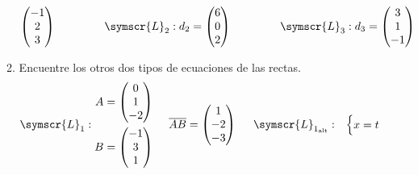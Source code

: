\documentclass{article}
\def\fancyL{\symscr{L}}
\begin{document}
\begin{enumerate}
\begin{enumerate}[label=\listAlph]
\[\begin{pmatrix}
                    -1 \\ 2 \\ 3
                \end{pmatrix}
                \hspace{1.5cm}
                \fancyL_2:
                d_2 =
                \begin{pmatrix}
                    6 \\ 0 \\ 2
                \end{pmatrix}
                \hspace{1.5cm}
                \fancyL_3:
                d_3 =
                \begin{pmatrix}
                    3 \\ 1 \\ -1
                \end{pmatrix}
            \]
		\item Encuentre los otros dos tipos de ecuaciones de las rectas.
            \[
                \begin{aligned}
                    &\fancyL_1:
                    \begin{aligned}
                        A &= 
                        \begin{pmatrix}
                            0 \\ 1 \\ -2
                        \end{pmatrix} \\
                        B &= 
                        \begin{pmatrix}
                            -1 \\ 3 \\ 1
                        \end{pmatrix}
                    \end{aligned}
                    \hspace{0.5cm}
                    \overline{AB} =
                    \begin{pmatrix}
                        1 \\ -2 \\ -3
                    \end{pmatrix}
                    \hspace{0.5cm}
                    \fancyL_{1_\text{alt}}:& 
                    \begin{cases}
                        x = t \\

\end{cases}
\end{aligned}\]
\end{enumerate}
\end{enumerate}
\end{document}
